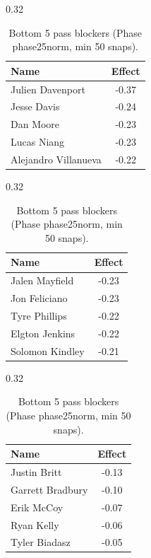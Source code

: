 \begin{table}[h!]
\centering
\begin{subtable}{0.32\textwidth}
\centering
\footnotesize
\begin{tabular}{lc}
\toprule
Name & Effect \\
\midrule
Julien Davenport & -0.37 \\
Jesse Davis & -0.24 \\
Dan Moore & -0.23 \\
Lucas Niang & -0.23 \\
Alejandro Villanueva & -0.22 \\
\bottomrule
\end{tabular}
\caption{T}
\end{subtable}
\hfill
\begin{subtable}{0.32\textwidth}
\centering
\footnotesize
\begin{tabular}{lc}
\toprule
Name & Effect \\
\midrule
Jalen Mayfield & -0.23 \\
Jon Feliciano & -0.23 \\
Tyre Phillips & -0.22 \\
Elgton Jenkins & -0.22 \\
Solomon Kindley & -0.21 \\
\bottomrule
\end{tabular}
\caption{G}
\end{subtable}
\hfill
\begin{subtable}{0.32\textwidth}
\centering
\footnotesize
\begin{tabular}{lc}
\toprule
Name & Effect \\
\midrule
Justin Britt & -0.13 \\
Garrett Bradbury & -0.10 \\
Erik McCoy & -0.07 \\
Ryan Kelly & -0.06 \\
Tyler Biadasz & -0.05 \\
\bottomrule
\end{tabular}
\caption{C}
\end{subtable}
\caption{Bottom 5 pass blockers (Phase phase25norm, min 50 snaps).}
\label{tab:blocker_pm_phase25norm_bot}
\end{table}
